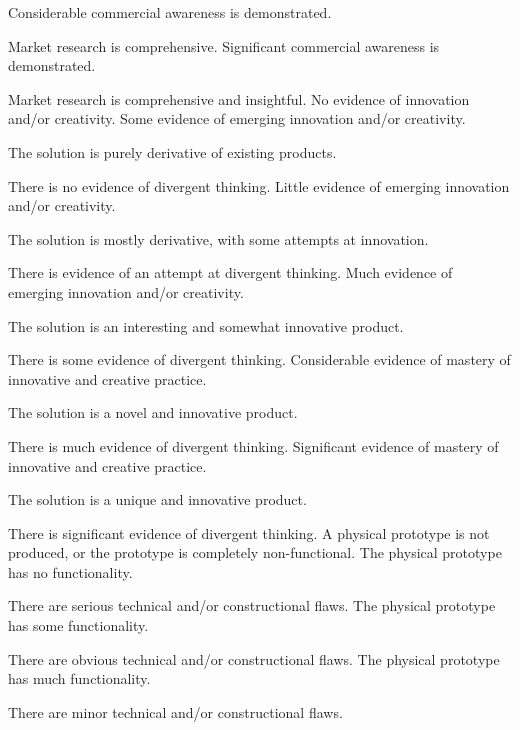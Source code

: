 \documentclass{../fal_assignment}
\begin{document}
\begin{markingrubric}
        \grade Considerable commercial awareness is demonstrated.
            \par Market research is comprehensive.
        \grade Significant commercial awareness is demonstrated.
            \par Market research is comprehensive and insightful.
        \grade\fail No evidence of innovation and/or creativity.
        \grade Some evidence of emerging innovation and/or creativity.
            \par The solution is purely derivative of existing products.
            \par There is no evidence of divergent thinking.
        \grade Little evidence of emerging innovation and/or creativity.
            \par The solution is mostly derivative, with some attempts at innovation.
            \par There is evidence of an attempt at divergent thinking.
        \grade Much evidence of emerging innovation and/or creativity.
            \par The solution is an interesting and somewhat innovative product.
            \par There is some evidence of divergent thinking.
        \grade Considerable evidence of mastery of innovative and creative practice.
            \par The solution is a novel and innovative product.
            \par There is much evidence of divergent thinking.
        \grade Significant evidence of mastery of innovative and creative practice.
            \par The solution is a unique and innovative product.
            \par There is significant evidence of divergent thinking.
        \grade\fail A physical prototype is not produced, or the prototype is completely non-functional.
        \grade The physical prototype has no functionality.
            \par There are serious technical and/or constructional flaws.
        \grade The physical prototype has some functionality.
            \par There are obvious technical and/or constructional flaws.
        \grade The physical prototype has much functionality.
            \par There are minor technical and/or constructional flaws.

\end{markingrubric}
\end{document}
